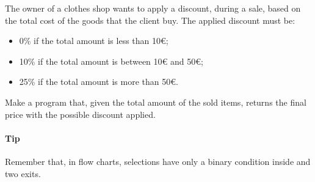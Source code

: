 



\ExamNameLine
\ExamStandardBoxEn
The owner of a clothes shop wants to apply a discount, during a sale,
based on the 
total cost of the goods that the client buy. The applied discount must
be:
\begin{itemize}
\item 0\% if the total amount is less than 10\euro;
\item 10\% if the total amount is between 10\euro{} and 50\euro;
\item 25\% if the total amount is more than 50\euro.
\end{itemize}

Make a program that, given the total amount of the sold items, returns
the final price with the possible discount applied.

\paragraph{Tip} Remember that, in flow charts, selections have only a binary
condition inside and two exits.


